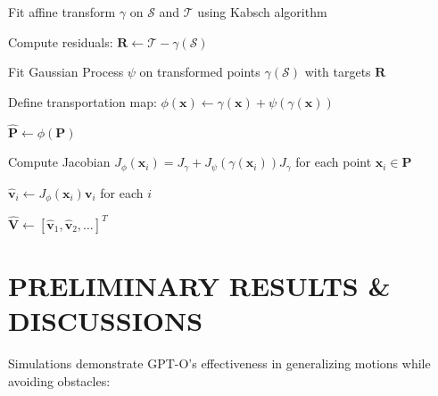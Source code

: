\documentclass[a4paper, 10pt, conference]{ieeeconf}
\begin{document}
\begin{algorithm}
    \caption{GPT-O warping}
    \SetAlgoLined{}



    Fit affine transform $\gamma$ on $\mathcal{S}$ and $\mathcal{T}$ using Kabsch algorithm\;

    Compute residuals: $\mathbf{R} \gets \mathcal{T} - \gamma(\mathcal{S})$\;

    Fit Gaussian Process $\psi$ on transformed points $\gamma(\mathcal{S})$ with targets $\mathbf{R}$\;

    Define transportation map: $\phi(\mathbf{x}) \gets \gamma(\mathbf{x}) + \psi(\gamma(\mathbf{x}))$\;

    $\hat{\mathbf{P}} \gets \phi(\mathbf{P})$

    Compute Jacobian $J_\phi(\mathbf{x}_i) = J_\gamma + J_\psi(\gamma(\mathbf{x}_i)) J_\gamma$ for each point $\mathbf{x}_i \in \mathbf{P}$\;

    $\hat{\mathbf{v}}_i \gets J_\phi(\mathbf{x}_i) \mathbf{v}_i$ for each $i$

    $\hat{\mathbf{V}} \gets {[\hat{\mathbf{v}}_1, \hat{\mathbf{v}}_2, \ldots]}^T$\;

\end{algorithm}

\section{PRELIMINARY RESULTS \& DISCUSSIONS}

Simulations demonstrate GPT-O's effectiveness in generalizing motions while avoiding obstacles:
\end{document}
